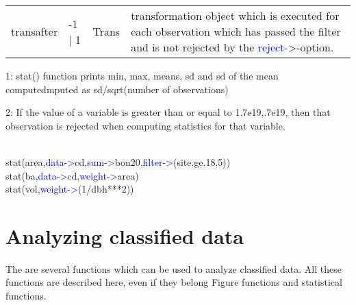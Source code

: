 \vspace{-1.51em}
\begin{table}[H]
\begin{tabular}{ m{}  m{}m{}p{}}
 transafter &-1 | 1& Trans& transformation object which is executed for each observation which has passed the filter and is not rejected by the \textcolor{blue}{reject}->-option.
\\ \cline{1-4}
\end{tabular}
\end{table}
\begin{note}
1: \textcolor{VioletRed}{stat}() function prints min, max, means, sd and sd of the mean computedmputed
 as sd/\textcolor{VioletRed}{sqrt}(number of observations)
\end{note}
\begin{note}
2: If the value of a variable is greater than or equal to 1.7e19,.7e19,
 then that observation is rejected when computing statistics for that variable.
\end{note}
\begin{example}[statex]\\
\label{statex}
 \textcolor{VioletRed}{stat}(area,\textcolor{blue}{data->}cd,\textcolor{blue}{sum->}bon20,\textcolor{blue}{filter->}(site.ge.18.5))\\
 \textcolor{VioletRed}{stat}(ba,\textcolor{blue}{data->}cd,\textcolor{blue}{weight->}area)\\
 \textcolor{VioletRed}{stat}(vol,\textcolor{blue}{weight->}(1/dbh***2))
\end{example}
\section{Analyzing classified data}
\label{classes}
The are several functions which can be used to analyze classified data.
All these functions are described here, even if they belong Figure functions and
 statistical functions.
